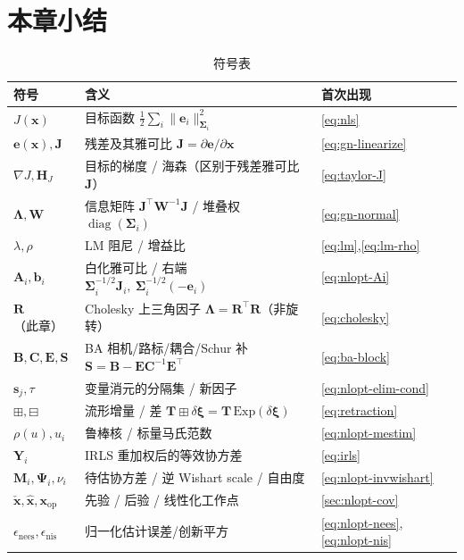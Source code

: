 \section*{本章小结}

\begin{table}[H]\centering\small
\caption{符号表}
\begin{tabular}{lll}
\toprule
符号 & 含义 & 首次出现 \\
\midrule
$J(\mathbf{x})$ & 目标函数 $\tfrac12\sum_i\|\mathbf{e}_i\|_{\boldsymbol{\Sigma}_i}^2$ & \cref{eq:nls} \\
$\mathbf{e}(\mathbf{x}),\mathbf{J}$ & 残差及其雅可比 $\mathbf{J}=\partial\mathbf{e}/\partial\mathbf{x}$ & \cref{eq:gn-linearize} \\
$\nabla J,\mathbf{H}_J$ & 目标的梯度 / 海森（区别于残差雅可比 $\mathbf{J}$） & \cref{eq:taylor-J} \\
$\boldsymbol{\Lambda},\mathbf{W}$ & 信息矩阵 $\mathbf{J}^\top\mathbf{W}^{-1}\mathbf{J}$ / 堆叠权 $\operatorname{diag}(\boldsymbol{\Sigma}_i)$ & \cref{eq:gn-normal} \\
$\lambda,\rho$ & LM 阻尼 / 增益比 & \cref{eq:lm},\cref{eq:lm-rho} \\
$\mathbf{A}_i,\mathbf{b}_i$ & 白化雅可比 / 右端 $\boldsymbol{\Sigma}_i^{-1/2}\mathbf{J}_i,\ \boldsymbol{\Sigma}_i^{-1/2}(-\mathbf{e}_i)$ & \cref{eq:nlopt-Ai} \\
$\mathbf{R}$（此章）& Cholesky 上三角因子 $\boldsymbol{\Lambda}=\mathbf{R}^\top\mathbf{R}$（非旋转） & \cref{eq:cholesky} \\
$\mathbf{B},\mathbf{C},\mathbf{E},\mathbf{S}$ & BA 相机/路标/耦合/Schur 补 $\mathbf{S}=\mathbf{B}-\mathbf{E}\mathbf{C}^{-1}\mathbf{E}^\top$ & \cref{eq:ba-block} \\
$\mathbf{s}_j,\tau$ & 变量消元的分隔集 / 新因子 & \cref{eq:nlopt-elim-cond} \\
$\boxplus,\boxminus$ & 流形增量 / 差 $\mathbf{T}\boxplus\delta\boldsymbol{\xi}=\mathbf{T}\,\mathrm{Exp}(\delta\boldsymbol{\xi})$ & \cref{eq:retraction} \\
$\rho(u),u_i$ & 鲁棒核 / 标量马氏范数 & \cref{eq:nlopt-mestim} \\
$\mathbf{Y}_i$ & IRLS 重加权后的等效协方差 & \cref{eq:irls} \\
$\mathbf{M}_i,\boldsymbol{\Psi}_i,\nu_i$ & 待估协方差 / 逆 Wishart scale / 自由度 & \cref{eq:nlopt-invwishart} \\
$\check{\mathbf{x}},\hat{\mathbf{x}},\mathbf{x}_{\mathrm{op}}$ & 先验 / 后验 / 线性化工作点 & \cref{sec:nlopt-cov} \\
$\epsilon_{\text{nees}},\epsilon_{\text{nis}}$ & 归一化估计误差/创新平方 & \cref{eq:nlopt-nees},\cref{eq:nlopt-nis} \\
\bottomrule
\end{tabular}
\end{table}

